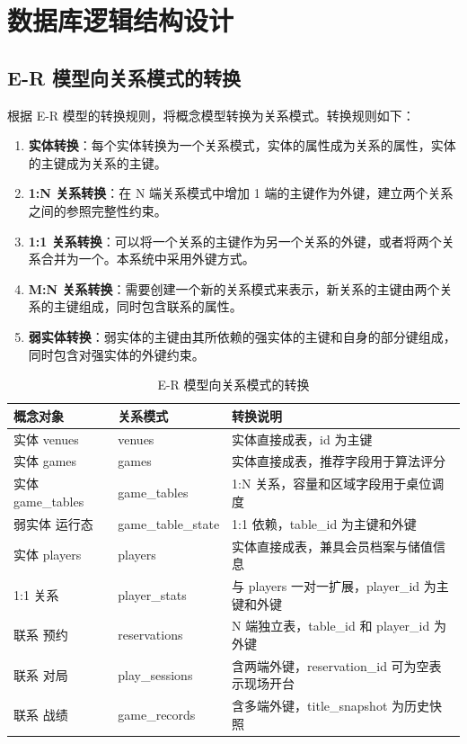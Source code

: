 \chapter{数据库逻辑结构设计}

\section{E-R 模型向关系模式的转换}

根据 E-R 模型的转换规则，将概念模型转换为关系模式。转换规则如下：

\begin{enumerate}
  \item \textbf{实体转换}：每个实体转换为一个关系模式，实体的属性成为关系的属性，实体的主键成为关系的主键。
  \item \textbf{1:N 关系转换}：在 N 端关系模式中增加 1 端的主键作为外键，建立两个关系之间的参照完整性约束。
  \item \textbf{1:1 关系转换}：可以将一个关系的主键作为另一个关系的外键，或者将两个关系合并为一个。本系统中采用外键方式。
  \item \textbf{M:N 关系转换}：需要创建一个新的关系模式来表示，新关系的主键由两个关系的主键组成，同时包含联系的属性。
  \item \textbf{弱实体转换}：弱实体的主键由其所依赖的强实体的主键和自身的部分键组成，同时包含对强实体的外键约束。
\end{enumerate}

\begin{table}[H]
  \centering
  \footnotesize
  \caption{E-R 模型向关系模式的转换}
  \label{tab:er_to_relation}
  \begin{tabularx}{\textwidth}{|p{2.5cm}|p{3.5cm}|X|}
    \hline
    \textbf{概念对象} & \textbf{关系模式} & \textbf{转换说明} \\
    \hline
    实体 venues & venues & 实体直接成表，id 为主键 \\
    \hline
    实体 games & games & 实体直接成表，推荐字段用于算法评分 \\
    \hline
    实体 game\_tables & game\_tables & 1:N 关系，容量和区域字段用于桌位调度 \\
    \hline
    弱实体 运行态 & game\_table\_state & 1:1 依赖，table\_id 为主键和外键 \\
    \hline
    实体 players & players & 实体直接成表，兼具会员档案与储值信息 \\
    \hline
    1:1 关系 & player\_stats & 与 players 一对一扩展，player\_id 为主键和外键 \\
    \hline
    联系 预约 & reservations & N 端独立表，table\_id 和 player\_id 为外键 \\
    \hline
    联系 对局 & play\_sessions & 含两端外键，reservation\_id 可为空表示现场开台 \\
    \hline
    联系 战绩 & game\_records & 含多端外键，title\_snapshot 为历史快照 \\
    \hline
  \end{tabularx}
\end{table}

